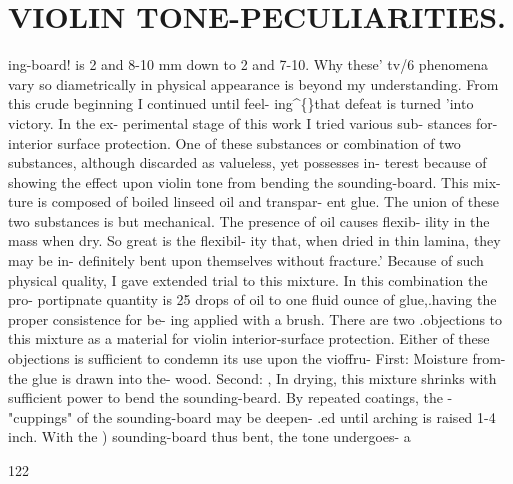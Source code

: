 \documentclass{article}
\begin{document}
\section*{VIOLIN TONE-PECULIARITIES.}
ing-board! is 2 and 8-10 mm down to 2 and 7-10. Why these' tv/6 phenomena vary so diametrically in physical appearance is beyond my understanding. From this crude beginning I continued until feel- ing\textasciicircum\{\}that defeat is turned 'into victory. In the ex- perimental stage of this work I tried various sub- stances for- interior surface protection. One of these substances or combination of two substances, although discarded as valueless, yet possesses in- terest because of showing the effect upon violin tone from bending the sounding-board. This mix- ture is composed of boiled linseed oil and transpar- ent glue. The union of these two substances is but mechanical. The presence of oil causes flexib- ility in the mass when dry. So great is the flexibil- ity that, when dried in thin lamina, they may be in- definitely bent upon themselves without fracture.' Because of such physical quality, I gave extended trial to this mixture. In this combination the pro- portipnate quantity is 25 drops of oil to one fluid ounce of glue,.having the proper consistence for be- ing applied with a brush. There are two .objections to this mixture as a material for violin interior-surface protection. Either of these objections is sufficient to condemn its use upon the vioffru- First: Moisture from- the glue is drawn into the- wood. Second: , In drying, this mixture shrinks with sufficient power to bend the sounding-beard. By repeated coatings, the -"cuppings" of the sounding-board may be deepen- .ed until arching is raised 1-4 inch. With the ) sounding-board thus bent, the tone undergoes- a

122
\end{document}
